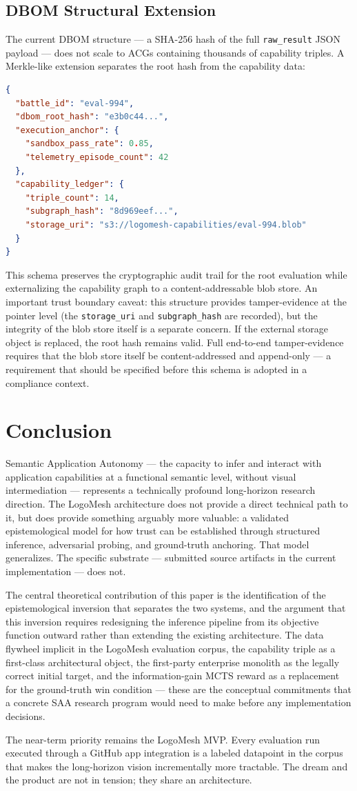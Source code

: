 \documentclass[11pt, a4paper]{article}
\begin{document}
\subsection{DBOM Structural Extension}

The current DBOM structure — a SHA-256 hash of the full \texttt{raw\_result} JSON payload — does not scale to ACGs containing thousands of capability triples. A Merkle-like extension separates the root hash from the capability data:

\begin{lstlisting}[language=json]
{
  "battle_id": "eval-994",
  "dbom_root_hash": "e3b0c44...",
  "execution_anchor": {
    "sandbox_pass_rate": 0.85,
    "telemetry_episode_count": 42
  },
  "capability_ledger": {
    "triple_count": 14,
    "subgraph_hash": "8d969eef...",
    "storage_uri": "s3://logomesh-capabilities/eval-994.blob"
  }
}
\end{lstlisting}

This schema preserves the cryptographic audit trail for the root evaluation while externalizing the capability graph to a content-addressable blob store. An important trust boundary caveat: this structure provides tamper-evidence at the pointer level (the \texttt{storage\_uri} and \texttt{subgraph\_hash} are recorded), but the integrity of the blob store itself is a separate concern. If the external storage object is replaced, the root hash remains valid. Full end-to-end tamper-evidence requires that the blob store itself be content-addressed and append-only — a requirement that should be specified before this schema is adopted in a compliance context.

\section{Conclusion}

Semantic Application Autonomy — the capacity to infer and interact with application capabilities at a functional semantic level, without visual intermediation — represents a technically profound long-horizon research direction. The LogoMesh architecture does not provide a direct technical path to it, but does provide something arguably more valuable: a validated epistemological model for how trust can be established through structured inference, adversarial probing, and ground-truth anchoring. That model generalizes. The specific substrate — submitted source artifacts in the current implementation — does not.

The central theoretical contribution of this paper is the identification of the epistemological inversion that separates the two systems, and the argument that this inversion requires redesigning the inference pipeline from its objective function outward rather than extending the existing architecture. The data flywheel implicit in the LogoMesh evaluation corpus, the capability triple as a first-class architectural object, the first-party enterprise monolith as the legally correct initial target, and the information-gain MCTS reward as a replacement for the ground-truth win condition — these are the conceptual commitments that a concrete SAA research program would need to make before any implementation decisions.

The near-term priority remains the LogoMesh MVP. Every evaluation run executed through a GitHub app integration is a labeled datapoint in the corpus that makes the long-horizon vision incrementally more tractable. The dream and the product are not in tension; they share an architecture.
\end{document}
